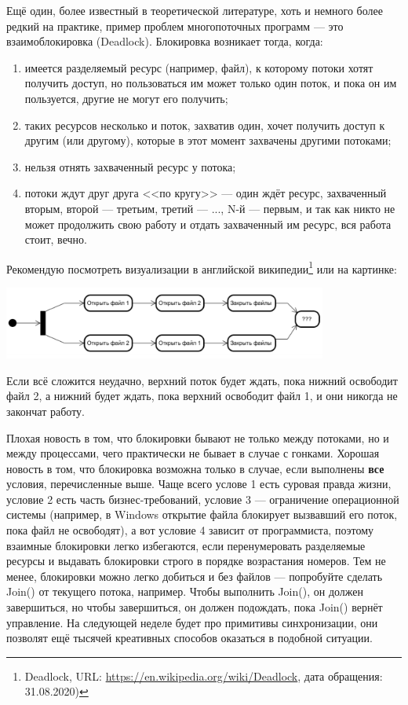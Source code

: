 \documentclass[a5paper]{article}
\begin{document}
Ещё один, более известный в теоретической литературе, хоть и немного более редкий на практике, пример проблем многопоточных программ --- это взаимоблокировка (Deadlock). Блокировка возникает тогда, когда:
\begin{enumerate}
    \item имеется разделяемый ресурс (например, файл), к которому потоки хотят получить доступ, но пользоваться им может только один поток, и пока он им пользуется, другие не могут его получить;
    \item таких ресурсов несколько и поток, захватив один, хочет получить доступ к другим (или другому), которые в этот момент захвачены другими потоками;
    \item нельзя отнять захваченный ресурс у потока;
    \item потоки ждут друг друга <<по кругу>> --- один ждёт ресурс, захваченный вторым, второй --- третьим, третий --- ..., N-й --- первым, и так как никто не может продолжить свою работу и отдать захваченный им ресурс, вся работа стоит, вечно.
\end{enumerate}

Рекомендую посмотреть визуализации в английской википедии\footnote{Deadlock, URL: \url{https://en.wikipedia.org/wiki/Deadlock}, дата обращения: 31.08.2020)} или на картинке: 

\begin{center}
    \includegraphics[width=0.8\textwidth]{deadlock.png}
\end{center}

Если всё сложится неудачно, верхний поток будет ждать, пока нижний освободит файл 2, а нижний будет ждать, пока верхний освободит файл 1, и они никогда не закончат работу.

Плохая новость в том, что блокировки бывают не только между потоками, но и между процессами, чего практически не бывает в случае с гонками. Хорошая новость в том, что блокировка возможна только в случае, если выполнены \textbf{все} условия, перечисленные выше. Чаще всего услове 1 есть суровая правда жизни, условие 2 есть часть бизнес-требований, условие 3 --- ограничение операционной системы (например, в Windows открытие файла блокирует вызвавший его поток, пока файл не освободят), а вот условие 4 зависит от программиста, поэтому взаимные блокировки легко избегаются, если перенумеровать разделяемые ресурсы и выдавать блокировки строго в порядке возрастания номеров. Тем не менее, блокировки можно легко добиться и без файлов --- попробуйте сделать Join() от текущего потока, например. Чтобы выполнить Join(), он должен завершиться, но чтобы завершиться, он должен подождать, пока Join() вернёт управление. На следующей неделе будет про примитивы синхронизации, они позволят ещё тысячей креативных способов оказаться в подобной ситуации.
\end{document}
